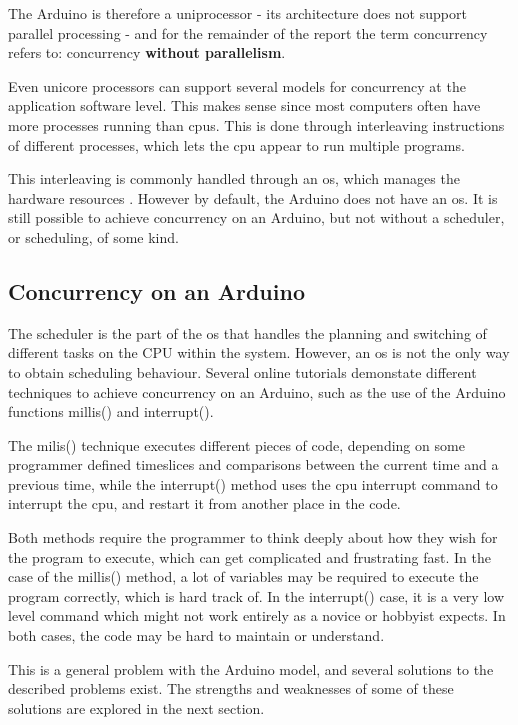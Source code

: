 The Arduino is therefore a uniprocessor\cite{Bryant2016} - its architecture does not support parallel processing - and for the remainder of the report the term concurrency refers to: concurrency \textbf{without parallelism}.

Even unicore processors can support several models for concurrency at the application software level. This makes sense since most computers often have more processes running than \glspl{cpu}. This is done through interleaving instructions of different processes, which lets the \gls{cpu} appear to run multiple programs.

This interleaving is commonly handled through an \gls{os}, which manages the hardware resources \cite{Bryant2016}. However by default, the Arduino does not have an \gls{os}. It is still possible to achieve concurrency on an Arduino, but not without a scheduler, or scheduling, of some kind.

\subsection{Concurrency on an Arduino}\label{subsec:concurrencyinarduino}
The scheduler is the part of the \gls{os} that handles the planning and switching of different tasks on the CPU within the system. However, an \gls{os} is not the only way to obtain scheduling behaviour. Several online tutorials \cite{BadExample1, BadExample2} demonstate different techniques to achieve concurrency on an Arduino, such as the use of the Arduino functions millis() and interrupt().

The milis() technique executes different pieces of code, depending on some programmer defined timeslices and comparisons between the current time and a previous time, while the interrupt() method uses the \gls{cpu} interrupt command to interrupt the \gls{cpu}, and restart it from another place in the code.

Both methods require the programmer to think deeply about how they wish for the program to execute, which can get complicated and frustrating fast. In the case of the millis() method, a lot of variables may be required to execute the program correctly, which is hard track of. In the interrupt() case, it is a very low level command which might not work entirely as a novice or hobbyist expects. In both cases, the code may be hard to maintain or understand.

This is a general problem with the Arduino model, and several solutions to the described problems exist. The strengths and weaknesses of some of these solutions are explored in the next section.
